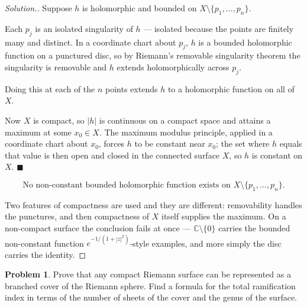 \documentclass[11pt,a4paper]{article}
\theoremstyle{definition}
\newtheorem{problemx}{Problem}[section]
\newenvironment{problem}{\begin{problemx}}{\end{problemx}}
\newenvironment{solution}
  {\renewcommand{\qedsymbol}{}\begin{proof}[\textit{Solution}.]}
  {\end{proof}}
\begin{document}
\begin{solution}
Suppose $h$ is holomorphic and bounded on $X \setminus \{p_1,\ldots,p_n\}$.

Each $p_j$ is an isolated singularity of $h$ --- isolated because the points are
finitely many and distinct. In a coordinate chart about $p_j$, $h$ is a bounded
holomorphic function on a punctured disc, so by Riemann's removable singularity
theorem the singularity is removable and $h$ extends holomorphically across $p_j$.

Doing this at each of the $n$ points extends $h$ to a holomorphic function on all
of $X$.

Now $X$ is compact, so $\left|h\right|$ is continuous on a compact space and
attains a maximum at some $x_0 \in X$. The maximum modulus principle, applied in a
coordinate chart about $x_0$, forces $h$ to be constant near $x_0$; the set where
$h$ equals that value is then open and closed in the connected surface $X$, so
$h$ is constant on $X$. $\blacksquare$

$$\boxed{\text{No non-constant bounded holomorphic function exists on }
X\setminus\{p_1,\ldots,p_n\}.}$$

Two features of compactness are used and they are different: removability handles
the punctures, and then compactness of $X$ itself supplies the maximum. On a
non-compact surface the conclusion fails at once --- $\mathbb{C}\setminus\{0\}$
carries the bounded non-constant function $e^{-1/(1+\left|z\right|^{2})}$-style
examples, and more simply the disc carries the identity.
\end{solution}


\begin{problem}
Prove that any compact Riemann surface can be represented as a branched cover of
the Riemann sphere. Find a formula for the total ramification index in terms of
the number of sheets of the cover and the genus of the surface.
\end{problem}
\end{document}
